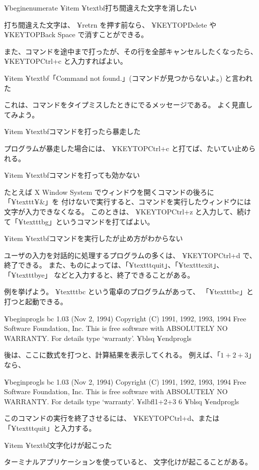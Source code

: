 {{{¥begin{enumerate}
¥item ¥textbf{打ち間違えた文字を消したい}

打ち間違えた文字は、 ¥retrn を押す前なら、
 ¥KEYTOP{Delete} や ¥KEYTOP{Back Space} で消すことができる。

また、コマンドを途中まで打ったが、その行を全部キャンセルしたくなったら、
 ¥KEYTOP{Ctrl}+c と入力すればよい。

¥item ¥textbf{「Command not found.」(コマンドが見つからないよ。) と言われた}

これは、コマンドをタイプミスしたときにでるメッセージである。
よく見直してみよう。

¥item ¥textbf{コマンドを打ったら暴走した}

プログラムが暴走した場合には、 ¥KEYTOP{Ctrl}+c と打てば、たいてい止められる。

¥item ¥textbf{コマンドを打っても効かない}

たとえば X Window System でウィンドウを開くコマンドの後ろに「¥texttt{¥&}」を
付けないで実行すると、コマンドを実行したウィンドウには文字が入力できなくなる。
このときは、 ¥KEYTOP{Ctrl}+z と入力して、続けて「¥texttt{bg}」というコマンドを打てばよい。

¥item ¥textbf{コマンドを実行したが止め方がわからない}

ユーザの入力を対話的に処理するプログラムの多くは、
 ¥KEYTOP{Ctrl}+d で、終了できる。
また、ものによっては、「¥texttt{quit}」、「¥texttt{exit}」、「¥texttt{bye}」
などと入力すると、終了できることがある。

例を挙げよう。
¥texttt{bc} という電卓のプログラムがあって、
「¥texttt{bc}」と打つと起動できる。

¥begin{progls}
bc 1.03 (Nov 2, 1994)
Copyright (C) 1991, 1992, 1993, 1994 Free Software Foundation, Inc.
This is free software with ABSOLUTELY NO WARRANTY.
For details type `warranty'. 
¥blsq
¥end{progls}

後は、ここに数式を打つと、計算結果を表示してくれる。
例えば、「$1+2+3$」なら、

¥begin{progls}
bc 1.03 (Nov 2, 1994)
Copyright (C) 1991, 1992, 1993, 1994 Free Software Foundation, Inc.
This is free software with ABSOLUTELY NO WARRANTY.
For details type `warranty'. 
¥slbfl{1+2+3}
6
¥blsq
¥end{progls}

このコマンドの実行を終了させるには、 ¥KEYTOP{Ctrl}+d、または「¥texttt{quit}」と入力する。

¥item ¥textbf{文字化けが起こった}

ターミナルアプリケーションを使っていると、
文字化けが起こることがある。

}}}
